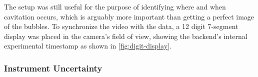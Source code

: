 The setup was still useful for the purpose of identifying where and when cavitation occurs, which is arguably more important than getting a perfect image of the bubbles. To synchronize the video with the data, a 12 digit 7-segment display was placed in the camera's field of view, showing the backend's internal experimental timestamp as shown in \cref{fig:digit-display}.



\subsubsection{Instrument Uncertainty}


